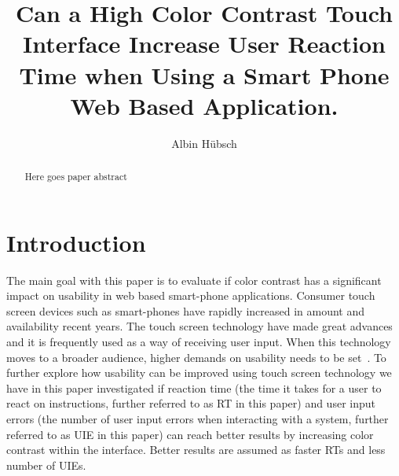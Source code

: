 \documentclass[runningheads,a4paper]{llncs}
\begin{document}
\pagestyle{headings}

\mainmatter


\title{Can a High Color Contrast Touch Interface Increase User Reaction Time when Using a Smart Phone Web Based Application.}





\author{Albin Hübsch}


\maketitle

%
\begin{abstract}
Here goes paper abstract
\end{abstract}
%

\section{Introduction}
The main goal with this paper is to evaluate if color contrast has a significant impact on usability in web based smart-phone applications. Consumer touch screen devices such as smart-phones have rapidly increased in amount and availability recent years. The touch screen technology have made great advances~\cite{jennings2013touch} and it is frequently used as a way of receiving user input. When this technology moves to a broader audience, higher demands on usability needs to be set~\cite{gong2004guidelines}. To further explore how usability can be improved using touch screen technology we have in this paper investigated if reaction time (the time it takes for a user to react on instructions, further referred to as RT in this paper) and user input errors (the number of user input errors when interacting with a system, further referred to as UIE in this paper) can reach better results by increasing color contrast within the interface. Better results are assumed as faster RTs and less number of UIEs. 
\end{document}
